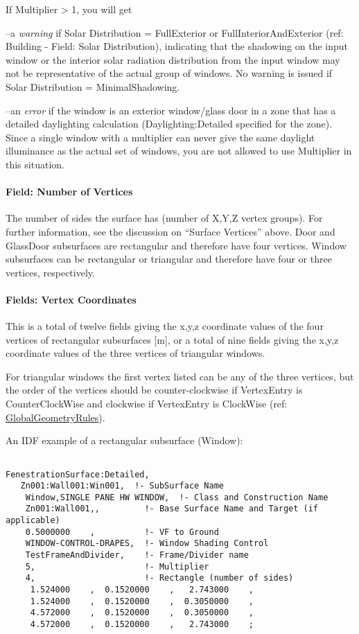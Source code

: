 If Multiplier \textgreater{} 1, you will get

--a \emph{warning} if Solar Distribution = FullExterior or FullInteriorAndExterior (ref: Building - Field: Solar Distribution), indicating that the shadowing on the input window or the interior solar radiation distribution from the input window may not be representative of the actual group of windows. No warning is issued if Solar Distribution = MinimalShadowing.

--an \emph{error} if the window is an exterior window/glass door in a zone that has a detailed daylighting calculation (Daylighting:Detailed specified for the zone). Since a single window with a multiplier can never give the same daylight illuminance as the actual set of windows, you are not allowed to use Multiplier in this situation.

\paragraph{Field: Number of Vertices}\label{field-number-of-vertices-4}

The number of sides the surface has (number of X,Y,Z vertex groups). For further information, see the discussion on ``Surface Vertices'' above. Door and GlassDoor subsurfaces are rectangular and therefore have four vertices. Window subsurfaces can be rectangular or triangular and therefore have four or three vertices, respectively.

\paragraph{Fields: Vertex Coordinates}\label{fields-vertex-coordinates}

This is a total of twelve fields giving the x,y,z coordinate values of the four vertices of rectangular subsurfaces {[}m{]}, or a total of nine fields giving the x,y,z coordinate values of the three vertices of triangular windows.

For triangular windows the first vertex listed can be any of the three vertices, but the order of the vertices should be counter-clockwise if VertexEntry is CounterClockWise and clockwise if VertexEntry is ClockWise (ref: \hyperref[globalgeometryrules]{GlobalGeometryRules}).

An IDF example of a rectangular subsurface (Window):

\begin{lstlisting}

FenestrationSurface:Detailed,
   Zn001:Wall001:Win001,  !- SubSurface Name
    Window,SINGLE PANE HW WINDOW,  !- Class and Construction Name
    Zn001:Wall001,,         !- Base Surface Name and Target (if applicable)
    0.5000000    ,          !- VF to Ground
    WINDOW-CONTROL-DRAPES,  !- Window Shading Control
    TestFrameAndDivider,    !- Frame/Divider name
    5,                      !- Multiplier
    4,                      !- Rectangle (number of sides)
     1.524000    ,  0.1520000    ,   2.743000    ,
     1.524000    ,  0.1520000    ,  0.3050000    ,
     4.572000    ,  0.1520000    ,  0.3050000    ,
     4.572000    ,  0.1520000    ,   2.743000    ;
\end{lstlisting}

